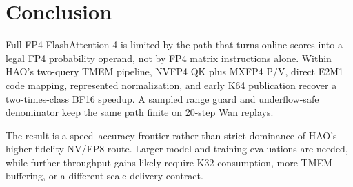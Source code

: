 \section{Conclusion}

Full-FP4 FlashAttention-4 is limited by the path that turns online scores into
a legal FP4 probability operand, not by FP4 matrix instructions alone. Within
HAO's two-query TMEM pipeline, NVFP4 QK plus MXFP4 P/V, direct E2M1 code
mapping, represented normalization, and early K64 publication recover a
two-times-class BF16 speedup. A sampled range guard and underflow-safe
denominator keep the same path finite on 20-step Wan replays.

The result is a speed--accuracy frontier rather than strict dominance of
HAO's higher-fidelity NV/FP8 route. Larger model and training evaluations are
needed, while further throughput gains likely require K32 consumption, more
TMEM buffering, or a different scale-delivery contract.
